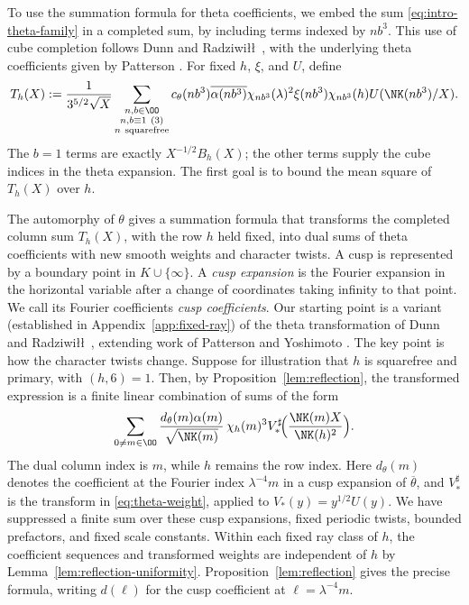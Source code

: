 To use the summation formula for theta coefficients, we embed the sum \eqref{eq:intro-theta-family} in a completed sum, by including terms indexed by $nb^3$. This use of cube completion follows Dunn and Radziwi\l\l\ \cite[Lemma~5.4 and Proposition~5.3]{DR}, with the underlying theta coefficients given by Patterson \cite[Theorem~8.1]{Pat77}. For fixed $h$, $\xi$, and $U$, define
\begin{equation}\label{eq:intro-completed-theta-sum}
T_h(X):=\frac{1}{3^{5/2}\sqrt X}
 \sum_{\substack{n,b\in\OO\\n,b\equiv1\ (3)\\n\ {\rm squarefree}}}
 c_\theta(nb^3)\overline{\alpha(nb^3)}\chi_{nb^3}(\lambda)^2
 \xi(nb^3)\chi_{nb^3}(h)U(\NK(nb^3)/X).
\end{equation}
The $b=1$ terms are exactly $X^{-1/2}B_h(X)$; the other
terms supply the cube indices in the theta expansion. The first goal is to bound the mean square of $T_h(X)$ over $h$.

The automorphy of $\theta$ gives a summation formula that transforms the completed column sum $T_h(X)$, with the row $h$ held fixed, into dual sums of theta coefficients with new smooth weights and character twists.
A cusp is represented by a boundary point in $K\cup\{\infty\}$. A \emph{cusp expansion} is the Fourier expansion in the horizontal variable after a change of coordinates taking infinity to that point. We call its Fourier coefficients \emph{cusp coefficients}.
Our starting point is a variant (established in Appendix~\ref{app:fixed-ray}) of the theta transformation of Dunn and Radziwi\l\l\ \cite[\S5]{DR}, extending work of Patterson \cite{Pat77} and Yoshimoto \cite{Yos87}. The key point is how the character twists change. Suppose for
illustration that $h$ is squarefree and primary, with $(h,6)=1$. Then, by Proposition~\ref{lem:reflection}, the transformed expression is a finite linear combination of sums of the form
\begin{equation}\label{eq:intro-dual-theta-sum}
 \sum_{0\ne m\in\OO}
 \frac{d_\theta(m)\alpha(m)}{\sqrt{\NK(m)}}\,
 \chi_h(m)^3
 V_*^\sharp\!\Bigl(\frac{\NK(m)X}{\NK(h)^2}\Bigr).
\end{equation}
The dual column index is $m$, while $h$ remains the row index.
Here $d_\theta(m)$ denotes the coefficient at the Fourier index
$\lambda^{-4}m$ in a cusp expansion of $\overline\theta$, and
$V_*^\sharp$ is the transform in \eqref{eq:theta-weight}, applied to $V_*(y)=y^{1/2}U(y)$.
We have suppressed
a finite sum over these cusp expansions, fixed periodic twists,
bounded prefactors, and fixed scale constants. Within each fixed
ray class of $h$, the coefficient sequences and transformed weights
are independent of $h$ by Lemma~\ref{lem:reflection-uniformity}.
Proposition~\ref{lem:reflection} gives the
precise formula, writing $d(\ell)$ for the cusp coefficient at
$\ell=\lambda^{-4}m$.

